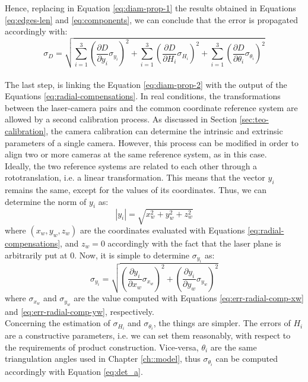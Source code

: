 Hence, replacing in Equation \ref{eq:diam-prop-1} the results obtained in Equations \ref{eq:edges-len} and \ref{eq:components}, we can conclude that the error is propagated accordingly with:
  \begin{equation}
    \sigma_D = \sqrt{
      \sum_{i = 1}^3 \left( \frac{\partial D}{\partial y_i} \sigma_{y_i} \right)^2 + 
      \sum_{i = 1}^3 \left( \frac{\partial D}{\partial H_i} \sigma_{H_i} \right)^2 + 
      \sum_{i = 1}^3 \left( \frac{\partial D}{\partial \theta_i} \sigma_{\theta_i} \right)^2
    }
    \label{eq:diam-prop-2}
  \end{equation} \\
 
The last step, is linking the Equation \ref{eq:diam-prop-2} with the output of the Equations \ref{eq:radial-compensations}. In real conditions, the transformations between the laser-camera pairs and the common coordinate reference system are allowed by a second calibration process. As discussed in Section \ref{sec:teo-calibration}, the camera calibration can determine the intrinsic and extrinsic parameters of a single camera. However, this process can be modified in order to align two or more cameras at the same reference system, as in this case. \\
Ideally, the two reference systems are related to each other through a rototranslation, i.e. a linear transformation. This means that the vector $y_i$ remains the same, except for the values of its coordinates. Thus, we can determine the norm of $y_i$ as:
  \begin{equation*}
    |y_i| = \sqrt{x_w^2 + y_w^2 + z_w^2}
  \end{equation*}
where $\left( x_w, y_w, z_w \right)$ are the coordinates evaluated with Equations \ref{eq:radial-compensations}, and $z_w = 0$ accordingly with the fact that the laser plane is arbitrarily put at $0$. Now, it is simple to determine $\sigma_{y_i}$ as:
  \begin{equation*}
    \sigma_{y_i} = \sqrt{
      \left( \frac{\partial y_i}{\partial x_w} \sigma_{x_w} \right)^2 + 
      \left( \frac{\partial y_i}{\partial y_w} \sigma_{y_w} \right)^2
    }
  \end{equation*}
where $\sigma_{x_w}$ and $\sigma_{y_w}$ are the value computed with Equations \ref{eq:err-radial-comp-xw} and \ref{eq:err-radial-comp-yw}, respectively. \\

Concerning the estimation of $\sigma_{H_i}$ and $\sigma_{\theta_i}$, the things are simpler. The errors of $H_i$ are a constructive parameters, i.e. we can set them reasonably, with respect to the requirements of product construction. Vice-versa, $\theta_i$ are the same triangulation angles used in Chapter \ref{ch::model}, thus $\sigma_{\theta_i}$ can be computed accordingly with Equation \ref{eq:det_a}.
